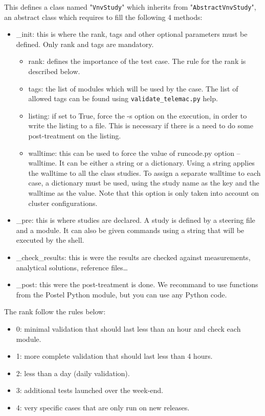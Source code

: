 This defines a class named "\verb!VnvStudy!" which inherits from
"\verb!AbstractVnvStudy!", an abstract class which requires to fill the
following 4 methods:
\begin{itemize}
\item \_init: this is where the rank, tags and other optional parameters must
  be defined. Only rank and tags are mandatory.
  \begin{itemize}
    \item rank: defines the importance of the test case. The rule for the rank
      is described below.
    \item tags: the list of modules which will be used by the case. The list
      of allowed tags can be found using \verb!validate_telemac.py! help.
    \item listing: if set to True, force the -s option on the execution, in
      order to write the listing to a file. This is necessary if there is a
      need to do some post-treatment on the listing.
    \item walltime: this can be used to force the value of runcode.py option
      --walltime. It can be either a string or a dictionary. Using a string
      applies the walltime to all the class studies. To assign a separate
      walltime to each case, a dictionary must be used, using the study name as
      the key and the walltime as the value. Note that this option is only
      taken into account on cluster configurations.
  \end{itemize}
\item \_pre: this is where studies are declared. A study is defined by a
  steering file and a module. It can also be given commands using a string that
  will be executed by the shell.
\item \_check\_results: this is were the results are checked against
  measurements, analytical solutions, reference files\ldots
\item \_post: this were the post-treatment is done. We recommand to use
  functions from the Postel Python module, but you can use any Python code.
\end{itemize}

The rank follow the rules below:
\begin{itemize}
\item 0: minimal validation that should last less than an hour and check each
  module.
\item 1: more complete validation that should last less than 4 hours.
\item 2: less than a day (daily validation).
\item 3: additional tests launched over the week-end.
\item 4: very specific cases that are only run on new releases.
\end{itemize}

